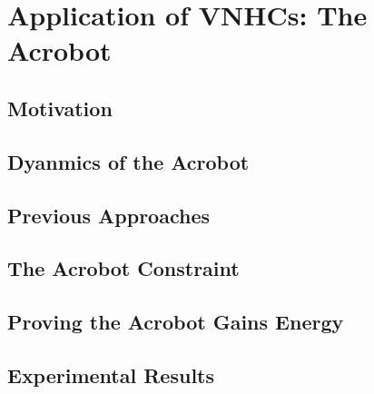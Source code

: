 

\chapter{Application of VNHCs: The Acrobot}\label{ch:acrobot}
\section{Motivation}
\section{Dyanmics of the Acrobot}
\section{Previous Approaches}

\section{The Acrobot Constraint}
\section{Proving the Acrobot Gains Energy}

\section{Experimental Results}


































